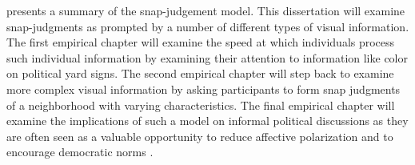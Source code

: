 \documentclass [12pt]{article}
\begin{document}
 presents a summary of the snap-judgement model. This dissertation will examine snap-judgments as prompted by a number of different types of visual information. The first empirical chapter will examine the speed at which individuals process such individual information by examining their attention to information like color on political yard signs. The second empirical chapter will step back to examine more complex visual information by asking participants to form snap judgments of a neighborhood with varying characteristics. The final empirical chapter will examine the implications of such a model on informal political discussions as they are often seen as a valuable opportunity to reduce affective polarization and to encourage democratic norms \citep{levendusky_stecula_2021, santoro_broockman_2022_sa}. 
\end{document}

